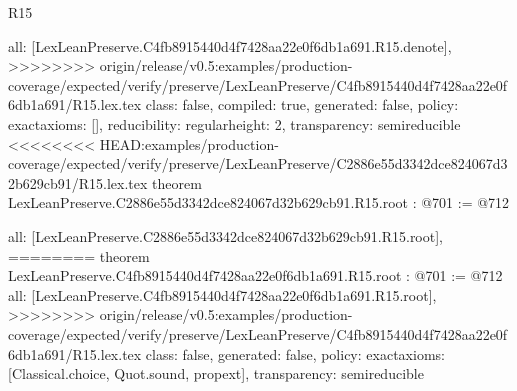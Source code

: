 \begin{lexlean}{R15}
\begin{coremodule}
{{{{{  all: [LexLeanPreserve.C4fb8915440d4f7428aa22e0f6db1a691.R15.denote],
>>>>>>>> origin/release/v0.5:examples/production-coverage/expected/verify/preserve/LexLeanPreserve/C4fb8915440d4f7428aa22e0f6db1a691/R15.lex.tex
  class: false,
  compiled: true,
  generated: false,
  policy: exact{axioms: []},
  reducibility: regular{height: 2},
  transparency: semireducible
}
<<<<<<<< HEAD:examples/production-coverage/expected/verify/preserve/LexLeanPreserve/C2886e55d3342dce824067d32b629cb91/R15.lex.tex
theorem LexLeanPreserve.C2886e55d3342dce824067d32b629cb91.R15.root : @701 := @712 {
  all: [LexLeanPreserve.C2886e55d3342dce824067d32b629cb91.R15.root],
========
theorem LexLeanPreserve.C4fb8915440d4f7428aa22e0f6db1a691.R15.root : @701 := @712 {
  all: [LexLeanPreserve.C4fb8915440d4f7428aa22e0f6db1a691.R15.root],
>>>>>>>> origin/release/v0.5:examples/production-coverage/expected/verify/preserve/LexLeanPreserve/C4fb8915440d4f7428aa22e0f6db1a691/R15.lex.tex
  class: false,
  generated: false,
  policy: exact{axioms: [Classical.choice, Quot.sound, propext]},
  transparency: semireducible
}

}}}}}
\end{coremodule}
\end{lexlean}
